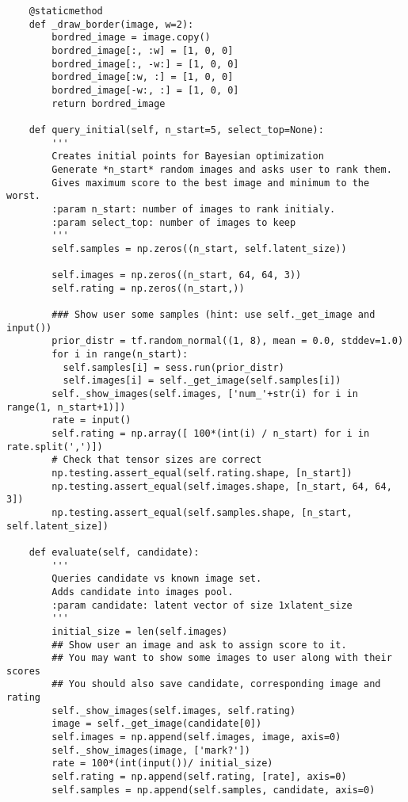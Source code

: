 \begin{footnotesize}
\begin{lstlisting}
    @staticmethod
    def _draw_border(image, w=2):
        bordred_image = image.copy()
        bordred_image[:, :w] = [1, 0, 0]
        bordred_image[:, -w:] = [1, 0, 0]
        bordred_image[:w, :] = [1, 0, 0]
        bordred_image[-w:, :] = [1, 0, 0]
        return bordred_image

    def query_initial(self, n_start=5, select_top=None):
        '''
        Creates initial points for Bayesian optimization
        Generate *n_start* random images and asks user to rank them.
        Gives maximum score to the best image and minimum to the worst.
        :param n_start: number of images to rank initialy.
        :param select_top: number of images to keep
        '''
        self.samples = np.zeros((n_start, self.latent_size))
        
        self.images = np.zeros((n_start, 64, 64, 3)) 
        self.rating = np.zeros((n_start,)) 
        
        ### Show user some samples (hint: use self._get_image and input())
        prior_distr = tf.random_normal((1, 8), mean = 0.0, stddev=1.0)
        for i in range(n_start):
          self.samples[i] = sess.run(prior_distr)
          self.images[i] = self._get_image(self.samples[i])
        self._show_images(self.images, ['num_'+str(i) for i in range(1, n_start+1)])
        rate = input()
        self.rating = np.array([ 100*(int(i) / n_start) for i in rate.split(',')])
        # Check that tensor sizes are correct
        np.testing.assert_equal(self.rating.shape, [n_start])
        np.testing.assert_equal(self.images.shape, [n_start, 64, 64, 3])
        np.testing.assert_equal(self.samples.shape, [n_start, self.latent_size])

    def evaluate(self, candidate):
        '''
        Queries candidate vs known image set.
        Adds candidate into images pool.
        :param candidate: latent vector of size 1xlatent_size
        '''
        initial_size = len(self.images)
        ## Show user an image and ask to assign score to it.
        ## You may want to show some images to user along with their scores
        ## You should also save candidate, corresponding image and rating
        self._show_images(self.images, self.rating)
        image = self._get_image(candidate[0])
        self.images = np.append(self.images, image, axis=0)
        self._show_images(image, ['mark?'])
        rate = 100*(int(input())/ initial_size)
        self.rating = np.append(self.rating, [rate], axis=0)
        self.samples = np.append(self.samples, candidate, axis=0)
        

\end{lstlisting}
\end{footnotesize}
